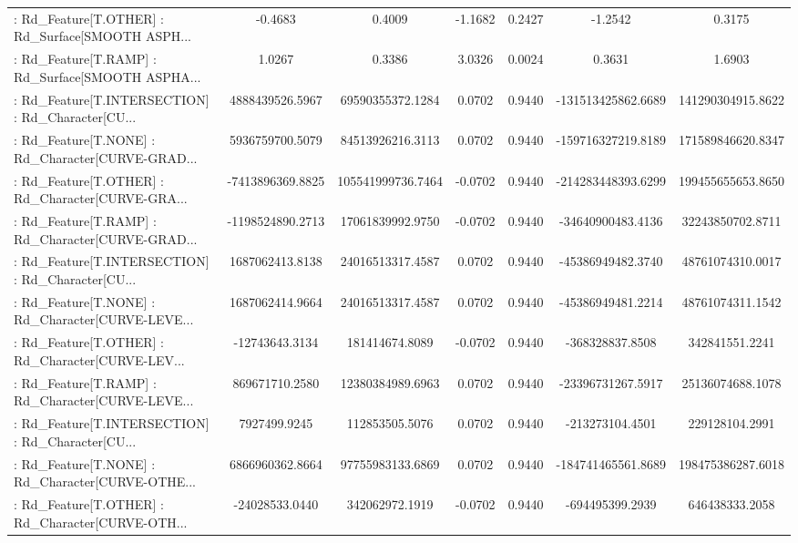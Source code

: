 \begin{longtable}{p{4cm}cccccc}
 : Rd\_Feature[T.OTHER] : Rd\_Surface[SMOOTH ASPH... &           -0.4683 &            0.4009 & -1.1682 &       0.2427 &            -1.2542 &            0.3175 \\
 : Rd\_Feature[T.RAMP] : Rd\_Surface[SMOOTH ASPHA... &            1.0267 &            0.3386 &  3.0326 &       0.0024 &             0.3631 &            1.6903 \\
 : Rd\_Feature[T.INTERSECTION] : Rd\_Character[CU... &   4888439526.5967 &  69590355372.1284 &  0.0702 &       0.9440 & -131513425862.6689 & 141290304915.8622 \\
 : Rd\_Feature[T.NONE] : Rd\_Character[CURVE-GRAD... &   5936759700.5079 &  84513926216.3113 &  0.0702 &       0.9440 & -159716327219.8189 & 171589846620.8347 \\
 : Rd\_Feature[T.OTHER] : Rd\_Character[CURVE-GRA... &  -7413896369.8825 & 105541999736.7464 & -0.0702 &       0.9440 & -214283448393.6299 & 199455655653.8650 \\
 : Rd\_Feature[T.RAMP] : Rd\_Character[CURVE-GRAD... &  -1198524890.2713 &  17061839992.9750 & -0.0702 &       0.9440 &  -34640900483.4136 &  32243850702.8711 \\
 : Rd\_Feature[T.INTERSECTION] : Rd\_Character[CU... &   1687062413.8138 &  24016513317.4587 &  0.0702 &       0.9440 &  -45386949482.3740 &  48761074310.0017 \\
 : Rd\_Feature[T.NONE] : Rd\_Character[CURVE-LEVE... &   1687062414.9664 &  24016513317.4587 &  0.0702 &       0.9440 &  -45386949481.2214 &  48761074311.1542 \\
 : Rd\_Feature[T.OTHER] : Rd\_Character[CURVE-LEV... &    -12743643.3134 &    181414674.8089 & -0.0702 &       0.9440 &    -368328837.8508 &    342841551.2241 \\
 : Rd\_Feature[T.RAMP] : Rd\_Character[CURVE-LEVE... &    869671710.2580 &  12380384989.6963 &  0.0702 &       0.9440 &  -23396731267.5917 &  25136074688.1078 \\
 : Rd\_Feature[T.INTERSECTION] : Rd\_Character[CU... &      7927499.9245 &    112853505.5076 &  0.0702 &       0.9440 &    -213273104.4501 &    229128104.2991 \\
 : Rd\_Feature[T.NONE] : Rd\_Character[CURVE-OTHE... &   6866960362.8664 &  97755983133.6869 &  0.0702 &       0.9440 & -184741465561.8689 & 198475386287.6018 \\
 : Rd\_Feature[T.OTHER] : Rd\_Character[CURVE-OTH... &    -24028533.0440 &    342062972.1919 & -0.0702 &       0.9440 &    -694495399.2939 &    646438333.2058 \\

\end{longtable}
